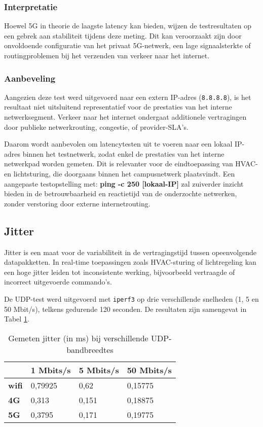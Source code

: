 \subsubsection{Interpretatie}
Hoewel 5G in theorie de laagste latency kan bieden, wijzen de testresultaten op een gebrek aan stabiliteit tijdens deze meting. Dit kan veroorzaakt zijn door onvoldoende configuratie van het privaat 5G-netwerk, een lage signaalsterkte of routingproblemen bij het verzenden van verkeer naar het internet.

\subsubsection{Aanbeveling}
Aangezien deze test werd uitgevoerd naar een extern IP-adres (\texttt{8.8.8.8}), is het resultaat niet uitsluitend representatief voor de prestaties van het interne netwerksegment. Verkeer naar het internet ondergaat additionele vertragingen door publieke netwerkrouting, congestie, of provider-SLA’s.

Daarom wordt aanbevolen om latencytesten uit te voeren naar een lokaal IP-adres binnen het testnetwerk, zodat enkel de prestaties van het interne netwerkpad worden gemeten. Dit is relevanter voor de eindtoepassing van HVAC- en lichtsturing, die doorgaans binnen het campusnetwerk plaatsvindt. Een aangepaste testopstelling met: \textbf{ping -c 250 [lokaal-IP]} zal zuiverder inzicht bieden in de betrouwbaarheid en reactietijd van de onderzochte netwerken, zonder verstoring door externe internetrouting.

\subsection{Jitter}
Jitter is een maat voor de variabiliteit in de vertragingstijd tussen opeenvolgende datapakketten. In real-time toepassingen zoals HVAC-sturing of lichtregeling kan een hoge jitter leiden tot inconsistente werking, bijvoorbeeld vertraagde of incorrect uitgevoerde commando’s.

De UDP-test werd uitgevoerd met \texttt{iperf3} op drie verschillende snelheden (1, 5 en 50 Mbit/s), telkens gedurende 120 seconden. De resultaten zijn samengevat in Tabel \ref{tab:jitter}.

\begin{table}[]
    \caption{Gemeten jitter (in ms) bij verschillende UDP-bandbreedtes}
    \begin{tabular}{l l l l}
        \cline{2-4}
        & \textbf{1 Mbits/s} & \textbf{5 Mbits/s} & \textbf{50 Mbits/s} \\ \hline
        \multicolumn{1}{l}{\textbf{wifi}} & 0,79925              & 0,62                 & 0,15775               \\ \hline
        \multicolumn{1}{l}{\textbf{4G}}   & 0,313                & 0,151                & 0,18875               \\ \hline
        \multicolumn{1}{l}{\textbf{5G}}   & 0,3795               & 0,171                & 0,19775               \\ \hline
    \end{tabular}
    
    \label{tab:jitter}
\end{table}


